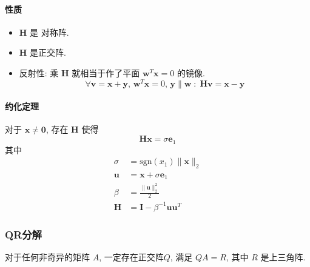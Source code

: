 \documentclass{ctexart}
\newcommand{\sgn}{\mathrm{sgn}}
\begin{document}
\paragraph{性质}
    \begin{itemize}
        \item $\mathbf{H} $ 是 对称阵.
        \item $\mathbf{H} $ 是正交阵.
        \item 反射性: 乘 $\mathbf{H}$ 就相当于作了平面 $\mathbf{w}^T \mathbf{x} = 0$ 的镜像.\[
            \forall \mathbf{v} = \mathbf{x} + \mathbf{y},\,\mathbf{w}^T \mathbf{x} = 0,\, \mathbf{y} \parallel \mathbf{w}\;:\;
            \mathbf{H} \mathbf{v} = \mathbf{x} - \mathbf{y} \]
    \end{itemize}
\paragraph{约化定理}
    对于 $\mathbf{x} \neq \mathbf{0} $, 存在 $ \mathbf{H}$ 使得 \[
        \mathbf{H} \mathbf{x} = \sigma \mathbf{e}_1\]
    其中 \begin{align*}
        \sigma &= \sgn (x_1) \|\mathbf{x} \|_2\\
        \mathbf{u}& = \mathbf{x} + \sigma \mathbf{e}_1\\
        \beta &= \frac{\|\mathbf{u}\|_2^2}{2}\\
        \mathbf{H} &= \mathbf{I} - \beta^{-1} \mathbf{u} \mathbf{u}^T
    \end{align*}
\subsubsection{QR分解}
    对于任何非奇异的矩阵 $A$, 一定存在正交阵$Q$,
    满足 $QA=R$, 其中 $R$ 是上三角阵.
\end{document}
